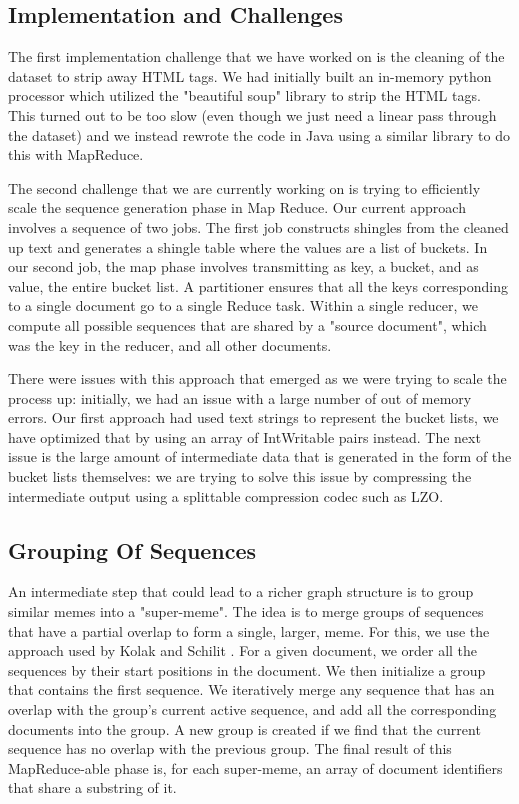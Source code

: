 \documentclass{acm_proc_article-sp}
\begin{document}
\subsection{Implementation and Challenges}
The first implementation challenge that we have worked on is the cleaning of the dataset to strip away HTML tags. We had initially built an in-memory python processor which utilized the "beautiful soup" library to strip the HTML tags. This turned out to be too slow (even though we just need a linear pass through the dataset) and we instead rewrote the code in Java using a similar library to do this with MapReduce.

The second challenge that we are currently working on is trying to efficiently scale the sequence generation phase in Map Reduce. Our current approach involves a sequence of two jobs. The first job constructs shingles from the cleaned up text and generates a shingle table where the values are a list of buckets. In our second job, the map phase involves transmitting as key, a bucket, and as value, the entire bucket list. A partitioner ensures that all the keys corresponding to a single document go to a single Reduce task. Within a single reducer, we compute all possible sequences that are shared by a "source document", which was the key in the reducer, and all other documents. 
 
There were issues with this approach that emerged as we were trying to scale the process up: initially, we had an issue with a large number of out of memory errors. Our first approach had used text strings to represent the bucket lists, we have optimized that by using an array of IntWritable pairs instead. The next issue is the large amount of intermediate data that is generated in the form of the bucket lists themselves: we are trying to solve this issue by compressing the intermediate output using a splittable compression codec such as LZO. 

\subsection{Grouping Of Sequences}
An intermediate step that could lead to a richer graph structure is to group similar memes into a "super-meme". The idea is to merge groups of sequences that have a partial overlap to form a single, larger, meme. For this, we use the approach used by Kolak and Schilit \cite{kolak2008generating}. For a given document, we order all the sequences by their start positions in the document. We then initialize a group that contains the first sequence. We iteratively merge any sequence that has an overlap with the group's current active sequence, and add all the corresponding documents into the group. A new group is created if we find that the current sequence has no overlap with the previous group. The final result of this MapReduce-able phase is, for each super-meme, an array of document identifiers that share a substring of it.
 
\end{document}
